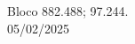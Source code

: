 \documentclass[
    12pt,                %
    openright,           %
    oneside,             %
    a4paper,             %
    english,             %
    spanish,             %
    brazil               %
]{ufscar}
\begin{document}
\cleardoublepage %


\vspace*{\fill} %
\begin{flushright}
    
        \centering %
        Bloco 882.488; 97.244. \\
        05/02/2025
\end{flushright}


\cleardoublepage %


\end{document}
